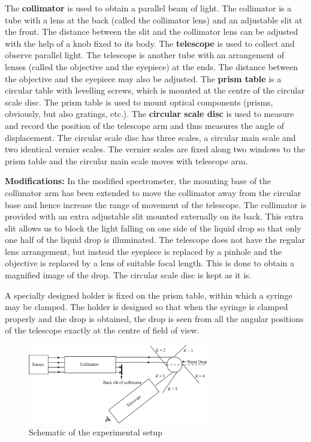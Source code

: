 The \textbf{collimator} is used to obtain a parallel beam of light. The collimator is a tube with a lens at the back (called the collimator lens) and an adjustable slit at the front. The distance between the slit and the collimator lens can be adjusted with the help of a knob fixed to its body. The \textbf{telescope} is used to collect and observe parallel light. The telescope is another tube with an arrangement of lenses (called the objective and the eyepiece) at the ends. The distance between the objective and the eyepiece may also be adjusted. The \textbf{prism table} is a circular table with levelling screws, which is mounted at the centre of the circular scale disc. The prism table is used to mount optical components (prisms, obviously, but also gratings, etc.).  The \textbf{circular scale disc} is used to measure and record the position of the telescope arm and thus measures the angle of displacement. The circular scale disc has three scales, a circular main scale and two identical vernier scales. The vernier scales are fixed along two windows to the prism table and the circular main scale moves with telescope arm.  

\textbf{Modifications:} In the modified spectrometer, the mounting base of the collimator arm has been extended to move the collimator away from the circular base and hence increase the range of movement of the telescope. The collimator is provided with an extra adjustable slit mounted externally on its back. This extra slit allows us to block the light falling on one side of the liquid drop so that only one half of the liquid drop is illuminated. The telescope does not have the regular lens arrangement, but instead the eyepiece is replaced by a pinhole and the objective is replaced by a lens of suitable focal length. This is done to obtain a magnified image of the drop. The circular scale disc is kept as it is. 

A specially designed holder is fixed on the prism table, within which a syringe may be clamped. The holder is designed so that when the syringe is clamped properly and the drop is obtained, the drop is seen from all the angular positions of the telescope exactly at the centre of field of view. 

\begin{figure}[!htb]
    \centering
    \includegraphics[width=0.70\textwidth]{figs/img2.jpg}
    \caption{Schematic of the experimental setup}
    \label{fig:experimentalsetup}
\end{figure}

